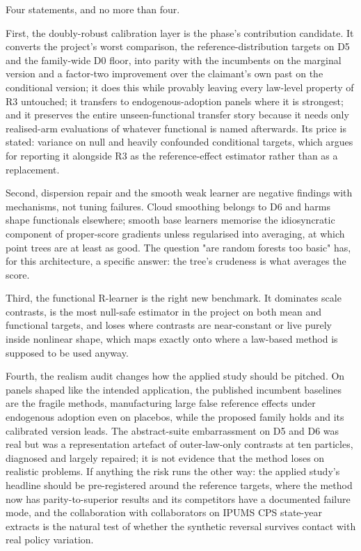 Four statements, and no more than four.

First, the doubly-robust calibration layer is the phase's contribution
candidate. It converts the project's worst comparison, the reference-distribution
targets on D5 and the family-wide D0 floor, into parity with the incumbents on
the marginal version and a factor-two improvement over the claimant's own past
on the conditional version; it does this while provably leaving every law-level
property of R3 untouched; it transfers to endogenous-adoption panels where it
is strongest; and it preserves the entire unseen-functional transfer story
because it needs only realised-arm evaluations of whatever functional is named
afterwards. Its price is stated: variance on null and heavily confounded
conditional targets, which argues for reporting it alongside R3 as the
reference-effect estimator rather than as a replacement.

Second, dispersion repair and the smooth weak learner are negative findings
with mechanisms, not tuning failures. Cloud smoothing belongs to D6 and harms
shape functionals elsewhere; smooth base learners memorise the idiosyncratic
component of proper-score gradients unless regularised into averaging, at
which point trees are at least as good. The question "are random forests too
basic" has, for this architecture, a specific answer: the tree's crudeness is
what averages the score.

Third, the functional R-learner is the right new benchmark. It dominates scale
contrasts, is the most null-safe estimator in the project on both mean and
functional targets, and loses where contrasts are near-constant or live purely
inside nonlinear shape, which maps exactly onto where a law-based method is
supposed to be used anyway.

Fourth, the realism audit changes how the applied study should be pitched.
On panels shaped like the intended application, the published incumbent
baselines are the fragile methods, manufacturing large false reference effects
under endogenous adoption even on placebos, while the proposed family holds
and its calibrated version leads. The abstract-suite embarrassment on D5 and
D6 was real but was a representation artefact of outer-law-only contrasts at
ten particles, diagnosed and largely repaired; it is not evidence that the
method loses on realistic problems. If anything the risk runs the other way:
the applied study's headline should be pre-registered around the reference
targets, where the method now has parity-to-superior results and its
competitors have a documented failure mode, and the collaboration with
collaborators on IPUMS CPS state-year extracts is the natural test of whether
the synthetic reversal survives contact with real policy variation.

